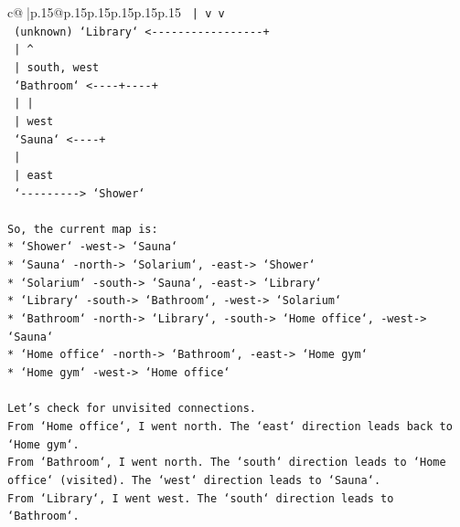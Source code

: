 \documentclass{article}
\begin{document}
{\begin{supertabular}{c@{$\;$}|p{.15\linewidth}@{}p{.15\linewidth}p{.15\linewidth}p{.15\linewidth}p{.15\linewidth}p{.15\linewidth}}
{{{\texttt{                         |                     v                      v} \\
\texttt{                   (unknown)                `Library` <{-}{-}{-}{-}{-}{-}{-}{-}{-}{-}{-}{-}{-}{-}{-}{-}{-}+} \\
\texttt{                         |                     \^{}} \\
\texttt{                         |                    south, west} \\
\texttt{                         `Bathroom` <{-}{-}{-}{-}+{-}{-}{-}{-}+} \\
\texttt{                            |            |} \\
\texttt{                            |           west} \\
\texttt{                            `Sauna` <{-}{-}{-}{-}+} \\
\texttt{                            |} \\
\texttt{                            |           east} \\
\texttt{                            `{-}{-}{-}{-}{-}{-}{-}{-}{-}> `Shower`} \\
\\ 
\texttt{So, the current map is:} \\
\texttt{*   `Shower` {-}west{-}> `Sauna`} \\
\texttt{*   `Sauna` {-}north{-}> `Solarium`, {-}east{-}> `Shower`} \\
\texttt{*   `Solarium` {-}south{-}> `Sauna`, {-}east{-}> `Library`} \\
\texttt{*   `Library` {-}south{-}> `Bathroom`, {-}west{-}> `Solarium`} \\
\texttt{*   `Bathroom` {-}north{-}> `Library`, {-}south{-}> `Home office`, {-}west{-}> `Sauna`} \\
\texttt{*   `Home office` {-}north{-}> `Bathroom`, {-}east{-}> `Home gym`} \\
\texttt{*   `Home gym` {-}west{-}> `Home office`} \\
\\ 
\texttt{Let's check for unvisited connections.} \\
\texttt{From `Home office`, I went north. The `east` direction leads back to `Home gym`.} \\
\texttt{From `Bathroom`, I went north. The `south` direction leads to `Home office` (visited). The `west` direction leads to `Sauna`.} \\
\texttt{From `Library`, I went west. The `south` direction leads to `Bathroom`.} \\
}}}
\end{supertabular}}
\end{document}
